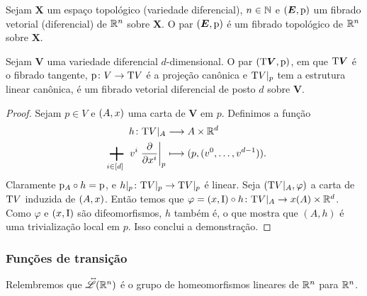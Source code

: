 \begin{proposition}
Sejam $\bm X$ um espaço topológico (variedade diferencial), $n \in \mathbb{N}$ e $(\bm E,\mathrm{p})$ um fibrado vetorial (diferencial) de $\mathbb{R}^n$ sobre $\bm X$. O par $(\bm E,\mathrm{p})$ é um fibrado topológico de $\mathbb{R}^n$ sobre $\bm X$.
\end{proposition}

\begin{proposition}
Sejam $\bm V$ uma variedade diferencial $d$-dimensional. O par $(\mathrm{T} \bm V,\mathrm{p})$, em que $\mathrm{T} \bm V$ é o fibrado tangente, $\mathrm{p}\colon V \to \mathrm{T} V$ é a projeção canônica e $\mathrm{T} V|_p$ tem a estrutura linear canônica, é um fibrado vetorial diferencial de posto $d$ sobre $\bm V$.
\end{proposition}
\begin{proof}
Sejam $p \in V$ e $(A,x)$ uma carta de $\bm V$ em $p$. Definimos a função
	\begin{align*}
	\func{h}{\Tg V|_A}{A \times \R^d}{\sum_{i \in [d]} v^i \derr{\x^i}_p}{(p,(v^0,\ldots,v^{d-1}))}.
	\end{align*}
Claramente $\mathrm{p}_A \circ h = \mathrm{p}$, e $h|_p\colon \mathrm{T} V|_p \to \mathrm{T} V|_p$ é linear. Seja $(\mathrm{T} V|_A,\varphi)$ a carta de $\mathrm{T} V$ induzida de $(A,x)$. Então temos que $\varphi = (x,\mathrm{I}) \circ h\colon \mathrm{T} V|_A \to x(A) \times \mathbb{R}^d$. Como $\varphi$ e $(x,\mathrm{I})$ são difeomorfismos, $h$ também é, o que mostra que $(A,h)$ é uma trivialização local em $p$. Isso conclui a demonstração.
\end{proof}

\subsubsection{Funções de transição}

Relembremos que $\accentset{\leftrightarrow}{\mathscr{L}}(\mathbb{R}^n)$ é o grupo de homeomorfismos lineares de $\mathbb{R}^n$ para $\mathbb{R}^n$.

